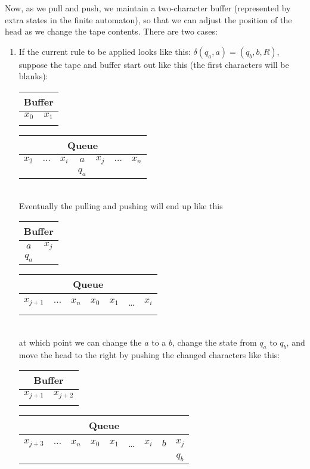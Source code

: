 \documentclass{article}
\begin{document}
\begin{enumerate}
Now, as we pull and push, we maintain a two-character buffer
(represented by extra states in the finite automaton), so that
we can adjust the position of the head as we change the tape
contents.  There are two cases:
  
  \begin{enumerate}
  \item If the current rule to be applied looks like this:
    $\delta(q_a,a) = (q_b,b,R)$, suppose the tape and buffer start
    out like this (the first characters will be blanks):\\
\begin{tabular}{|c|c|}\hline
  \multicolumn{2}{|c|}{Buffer}\\\hline
$x_0$   & $x_1$ \\&\\\hline
\end{tabular}
\begin{tabular}{|c|c|c|c|c|c|c|}\hline
  \multicolumn{7}{|c|}{Queue}\\\hline
$x_2$ &  $\ldots$ & $x_i$ & $a$ & $x_j$& $\ldots$ & $x_n$\\
&           &    & $q_a$ &    && \\\hline
\end{tabular}\\
Eventually the pulling and pushing will end up like this\\
\begin{tabular}{|c|c|}\hline
  \multicolumn{2}{|c|}{Buffer}\\\hline
  $a$   & $x_j$ \\
  $q_a$&\\\hline
\end{tabular}
\begin{tabular}{|c|c|c|c|c|c|c|}\hline
  \multicolumn{7}{|c|}{Queue}\\\hline
 $x_{j+1}$& $\ldots$ & $x_n$ & $x_0$ & $x_1$ &  \ldots &$x_i$ \\
&           &    & &    && \\\hline
\end{tabular}\\
at which point we can change the $a$ to a $b$,
change the state from $q_a$ to $q_b$, and move the head to the right
by pushing the changed characters like this:\\
\begin{tabular}{|c|c|}\hline
  \multicolumn{2}{|c|}{Buffer}\\\hline
  $x_{j+1}$   & $x_{j+2}$ \\
  &\\\hline
\end{tabular}
\begin{tabular}{|c|c|c|c|c|c|c|c|c|}\hline
  \multicolumn{9}{|c|}{Queue}\\\hline
 $x_{j+3}$& $\ldots$ & $x_n$ & $x_0$ & $x_1$ &  \ldots &$x_i$ & $b$ & $x_j$\\
&&           &    & &    && & $q_b$\\\hline
\end{tabular}\\




\end{enumerate}
\end{enumerate}
\end{document}
